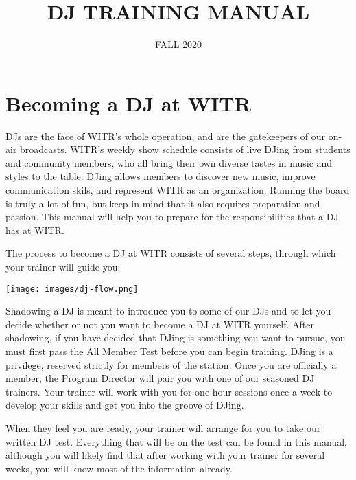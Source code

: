 \documentclass{witrman}
\title{DJ TRAINING MANUAL}
\date{FALL 2020}
\begin{document}
\maketitle

\maketoc{}

\setpagebg{}


\chapter{Becoming a DJ at WITR}

DJs are the face of WITR's whole operation, and are the gatekeepers of our
on-air broadcasts.  WITR's weekly show schedule consists of live DJing from
students and community members, who all bring their own diverse tastes in music
and styles to the table.  DJing allows members to discover new music, improve
communication skils, and represent WITR as an organization.  Running the board
is truly a lot of fun, but keep in mind that it also requires preparation and
passion.  This manual will help you to prepare for the responsibilities that a
DJ has at WITR\@.

The process to become a DJ at WITR consists of several steps, through which your
trainer will guide you:

\texttt{[image: images/dj-flow.png]}

Shadowing a DJ is meant to introduce you to some of our DJs and to let you
decide whether or not you want to become a DJ at WITR yourself.  After
shadowing, if you have decided that DJing is something you want to pursue, you
must first pass the All Member Test before you can begin training.  DJing is a
privilege, reserved strictly for members of the station.  Once you are
officially a member, the Program Director will pair you with one of our seasoned
DJ trainers.  Your trainer will work with you for one hour sessions once a week
to develop your skills and get you into the groove of DJing.

When they feel you are ready, your trainer will arrange for you to take our
written DJ test.  Everything that will be on the test can be found in this
manual, although you will likely find that after working with your trainer for
several weeks, you will know most of the information already.
\end{document}
